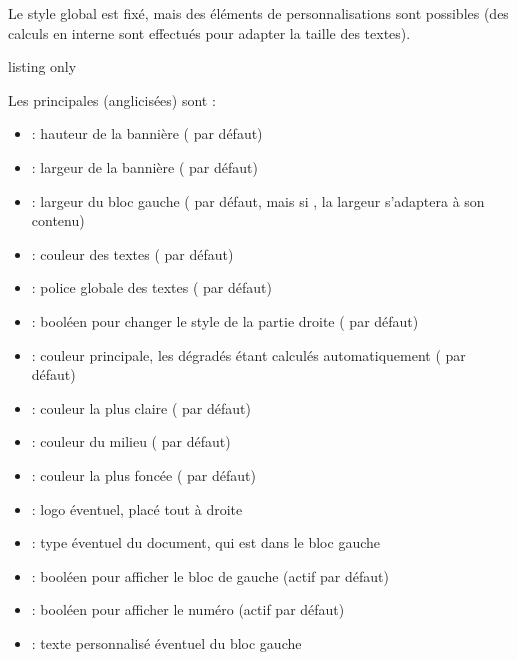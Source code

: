 \documentclass[french,11pt,a4paper]{article}
\begin{document}
Le style global est fixé, mais des éléments de personnalisations sont possibles (des calculs en interne sont effectués pour adapter la taille des textes).

\begin{DemoCode}{listing only}
\end{DemoCode}

\begin{DemoCode}{}
\end{DemoCode}

Les principales  (anglicisées) sont :

\begin{itemize}
	\item {} : hauteur de la bannière (\MontreCode{2.5em} par défaut)
	\item {} : largeur de la bannière ( par défaut)
	\item {} : largeur du bloc gauche (\MontreCode{2.75em} par défaut, mais si , la largeur s'adaptera à son contenu)
	\item {} : couleur des textes ( par défaut)
	\item {} : police globale des textes ( par défaut)
	\item {} : booléen pour changer le style de la partie droite ( par défaut)
	\item {} : couleur principale, les dégradés étant calculés automatiquement ( par défaut)
	\item {} : couleur la plus claire ( par défaut)
	\item {} : couleur du milieu ( par défaut)
	\item {} : couleur la plus foncée ( par défaut)
	\item {} : logo éventuel, placé tout à droite
	\item {} : type éventuel du document, qui est dans le bloc gauche
	\item {} : booléen pour afficher le bloc de gauche (actif par défaut)
	\item {} : booléen pour afficher le numéro (actif par défaut)
	\item {} : texte personnalisé éventuel du bloc gauche
\end{itemize}
\end{document}
